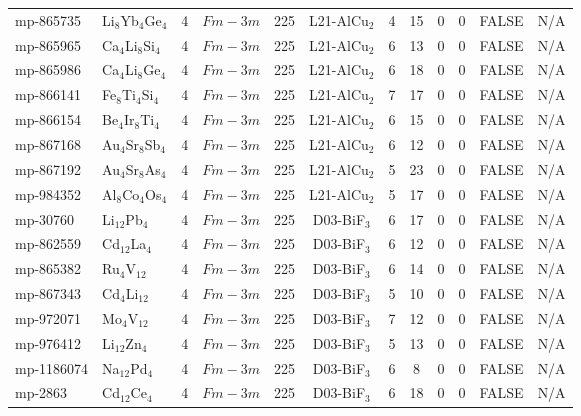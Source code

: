 {\begin{longtable}{llcccccccccc}
    mp-865735 & Li$_{8}$Yb$_{4}$Ge$_{4}$ & 4     & $Fm-3m$ & 225   & L21-AlCu$_{2}$ & 4     & 15    & 0     & 0     & FALSE & N/A \\
    mp-865965 & Ca$_{4}$Li$_{8}$Si$_{4}$ & 4     & $Fm-3m$ & 225   & L21-AlCu$_{2}$ & 6     & 13    & 0     & 0     & FALSE & N/A \\
    mp-865986 & Ca$_{4}$Li$_{8}$Ge$_{4}$ & 4     & $Fm-3m$ & 225   & L21-AlCu$_{2}$ & 6     & 18    & 0     & 0     & FALSE & N/A \\
    mp-866141 & Fe$_{8}$Ti$_{4}$Si$_{4}$ & 4     & $Fm-3m$ & 225   & L21-AlCu$_{2}$ & 7     & 17    & 0     & 0     & FALSE & N/A \\
    mp-866154 & Be$_{4}$Ir$_{8}$Ti$_{4}$ & 4     & $Fm-3m$ & 225   & L21-AlCu$_{2}$ & 6     & 15    & 0     & 0     & FALSE & N/A \\
    mp-867168 & Au$_{4}$Sr$_{8}$Sb$_{4}$ & 4     & $Fm-3m$ & 225   & L21-AlCu$_{2}$ & 6     & 12    & 0     & 0     & FALSE & N/A \\
    mp-867192 & Au$_{4}$Sr$_{8}$As$_{4}$ & 4     & $Fm-3m$ & 225   & L21-AlCu$_{2}$ & 5     & 23    & 0     & 0     & FALSE & N/A \\
    mp-984352 & Al$_{8}$Co$_{4}$Os$_{4}$ & 4     & $Fm-3m$ & 225   & L21-AlCu$_{2}$ & 5     & 17    & 0     & 0     & FALSE & N/A \\
    mp-30760 & Li$_{12}$Pb$_{4}$ & 4     & $Fm-3m$ & 225   & D03-BiF$_{3}$ & 6     & 17    & 0     & 0     & FALSE & N/A \\
    mp-862559 & Cd$_{12}$La$_{4}$ & 4     & $Fm-3m$ & 225   & D03-BiF$_{3}$ & 6     & 12    & 0     & 0     & FALSE & N/A \\
    mp-865382 & Ru$_{4}$V$_{12}$ & 4     & $Fm-3m$ & 225   & D03-BiF$_{3}$ & 6     & 14    & 0     & 0     & FALSE & N/A \\
    mp-867343 & Cd$_{4}$Li$_{12}$ & 4     & $Fm-3m$ & 225   & D03-BiF$_{3}$ & 5     & 10    & 0     & 0     & FALSE & N/A \\
    mp-972071 & Mo$_{4}$V$_{12}$ & 4     & $Fm-3m$ & 225   & D03-BiF$_{3}$ & 7     & 12    & 0     & 0     & FALSE & N/A \\
    mp-976412 & Li$_{12}$Zn$_{4}$ & 4     & $Fm-3m$ & 225   & D03-BiF$_{3}$ & 5     & 13    & 0     & 0     & FALSE & N/A \\
    mp-1186074 & Na$_{12}$Pd$_{4}$ & 4     & $Fm-3m$ & 225   & D03-BiF$_{3}$ & 6     & 8     & 0     & 0     & FALSE & N/A \\
    mp-2863 & Cd$_{12}$Ce$_{4}$ & 4     & $Fm-3m$ & 225   & D03-BiF$_{3}$ & 6     & 18    & 0     & 0     & FALSE & N/A \\

\end{longtable}}
